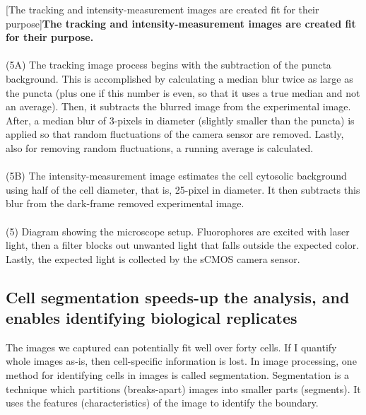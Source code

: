 \begin{centering}
[The tracking and intensity-measurement images are created fit for their purpose]{\textbf{The tracking and intensity-measurement images are created fit for their purpose.}
\\
\\
(5A) The tracking image process begins with the subtraction of the puncta background. This is accomplished by calculating a median blur twice as large as the puncta (plus one if this number is even, so that it uses a true median and not an average). Then, it subtracts the blurred image from the experimental image. After, a median blur of 3-pixels in diameter (slightly smaller than the puncta) is applied so that random fluctuations of the camera sensor are removed. Lastly, also for removing random fluctuations, a running average is calculated.
\\
\\
(5B) The intensity-measurement image estimates the cell cytosolic background using half of the cell diameter, that is, 25-pixel in diameter. It then subtracts this blur from the dark-frame removed experimental image.
\\
\\
(5) Diagram showing the microscope setup. Fluorophores are excited with laser light, then a filter blocks out unwanted light that falls outside the expected color. Lastly, the expected light is collected by the sCMOS camera sensor.}
\label{m:2}
\end{centering}


\subsection{Cell segmentation speeds-up the analysis, and enables identifying biological replicates}
The images we captured can potentially fit well over forty cells. If I quantify whole images as-is, then cell-specific information is lost. In image processing, one method for identifying cells in images is called segmentation. Segmentation is a technique which partitions (breaks-apart) images into smaller parts (segments). It uses the features (characteristics) of the image to identify the boundary.

